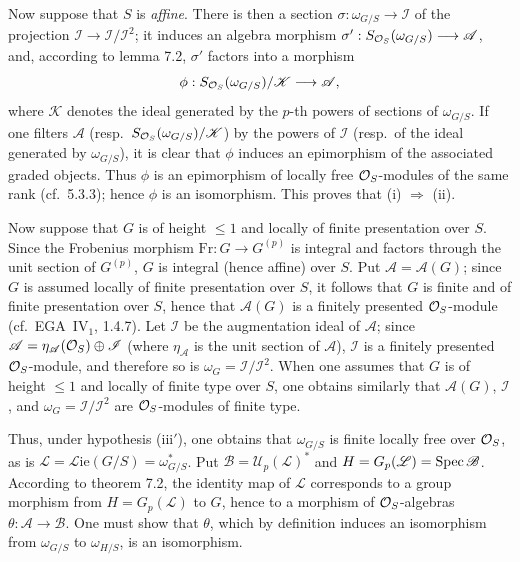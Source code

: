 Now suppose that $S$ is \emph{affine}. There is then a section $\sigma:\omega_{G/S}\to\mathscr I$ of the projection $\mathscr I\to\mathscr I/\mathscr I^2$; it induces an algebra morphism $\sigma':S_{\mathcal{O}_S}(\omega_{G/S})\longrightarrow\mathscr A$, and, according to lemma 7.2, $\sigma'$ factors into a morphism
\[
\phi:S_{\mathcal{O}_S}(\omega_{G/S})/\mathscr K\longrightarrow\mathscr A,
\]
where $\mathscr K$ denotes the ideal generated by the $p$-th powers of sections of $\omega_{G/S}$. If one filters $\mathscr A$ (resp.\ $S_{\mathcal{O}_S}(\omega_{G/S})/\mathscr K$) by the powers of $\mathscr I$ (resp.\ of the ideal generated by $\omega_{G/S}$), it is clear that $\phi$ induces an epimorphism of the associated graded objects. Thus $\phi$ is an epimorphism of locally free $\mathcal{O}_S$-modules of the same rank (cf.\ 5.3.3); hence $\phi$ is an isomorphism. This proves that (i) $\Rightarrow$ (ii).

Now suppose that $G$ is of height $\leq1$ and locally of finite presentation over $S$. Since the Frobenius morphism $\mathrm{Fr}:G\to G^{(p)}$ is integral and factors through the unit section of $G^{(p)}$, $G$ is integral (hence affine) over $S$. Put $\mathscr A=\mathscr A(G)$; since $G$ is assumed locally of finite presentation over $S$, it follows that $G$ is finite and of finite presentation over $S$, hence that $\mathscr A(G)$ is a finitely presented $\mathcal{O}_S$-module (cf.\ EGA~IV$_1$, 1.4.7). Let $\mathscr I$ be the augmentation ideal of $\mathscr A$; since $\mathscr A=\eta_{\mathscr A}(\mathcal{O}_S)\oplus\mathscr I$ (where $\eta_{\mathscr A}$ is the unit section of $\mathscr A$), $\mathscr I$ is a finitely presented $\mathcal{O}_S$-module, and therefore so is $\omega_G=\mathscr I/\mathscr I^2$. When one assumes that $G$ is of height $\leq1$ and locally of finite type over $S$, one obtains similarly that $\mathscr A(G)$, $\mathscr I$, and $\omega_G=\mathscr I/\mathscr I^2$ are $\mathcal{O}_S$-modules of finite type.

Thus, under hypothesis (iii$'$), one obtains that $\omega_{G/S}$ is finite locally free over $\mathcal{O}_S$, as is $\mathscr L=\mathscr L\!\mathrm{ie}(G/S)=\omega_{G/S}^*$. Put $\mathscr B=\mathscr U_p(\mathscr L)^*$ and $H=G_p(\mathscr L)=\operatorname{Spec}\mathscr B$. According to theorem 7.2, the identity map of $\mathscr L$ corresponds to a group morphism from $H=G_p(\mathscr L)$ to $G$, hence to a morphism of $\mathcal{O}_S$-algebras $\theta:\mathscr A\to\mathscr B$. One must show that $\theta$, which by definition induces an isomorphism from $\omega_{G/S}$ to $\omega_{H/S}$, is an isomorphism.

